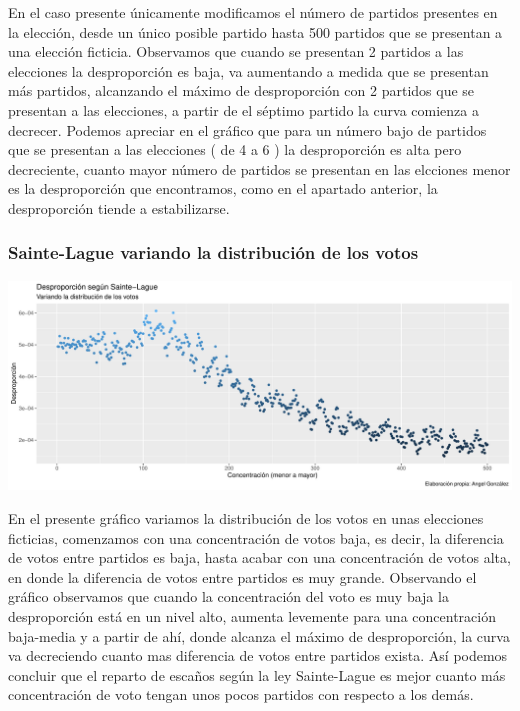 \documentclass[12pt,a4paper,]{book}
\numberwithin{dummy}{section}
\theoremstyle{ocrenumbox}
\theoremstyle{blacknumex}
\theoremstyle{blacknumbox}
\theoremstyle{ocrenum}
\theoremstyle{ocrenum}
\begin{document}
En el caso presente únicamente modificamos el número de partidos
presentes en la elección, desde un único posible partido hasta 500
partidos que se presentan a una elección ficticia. Observamos que cuando
se presentan 2 partidos a las elecciones la desproporción es baja, va
aumentando a medida que se presentan más partidos, alcanzando el máximo
de desproporción con 2 partidos que se presentan a las elecciones, a
partir de el séptimo partido la curva comienza a decrecer. Podemos
apreciar en el gráfico que para un número bajo de partidos que se
presentan a las elecciones ( de 4 a 6 ) la desproporción es alta pero
decreciente, cuanto mayor número de partidos se presentan en las
elcciones menor es la desproporción que encontramos, como en el apartado
anterior, la desproporción tiende a estabilizarse.

\hypertarget{sainte-lague-variando-la-distribuciuxf3n-de-los-votos}{%
\subsubsection{Sainte-Lague variando la distribución de los
votos}\label{sainte-lague-variando-la-distribuciuxf3n-de-los-votos}}

\begin{center}\includegraphics[width=0.95\linewidth]{figurasR/unnamed-chunk-16-1} \end{center}

En el presente gráfico variamos la distribución de los votos en unas
elecciones ficticias, comenzamos con una concentración de votos baja, es
decir, la diferencia de votos entre partidos es baja, hasta acabar con
una concentración de votos alta, en donde la diferencia de votos entre
partidos es muy grande. Observando el gráfico observamos que cuando la
concentración del voto es muy baja la desproporción está en un nivel
alto, aumenta levemente para una concentración baja-media y a partir de
ahí, donde alcanza el máximo de desproporción, la curva va decreciendo
cuanto mas diferencia de votos entre partidos exista. Así podemos
concluir que el reparto de escaños según la ley Sainte-Lague es mejor
cuanto más concentración de voto tengan unos pocos partidos con respecto
a los demás.
\end{document}
